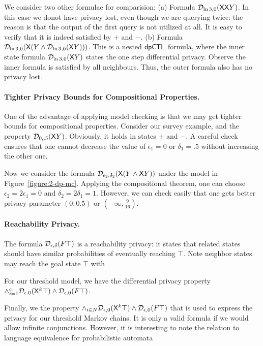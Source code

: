 We consider two other formulae for comparision:
(a) Formula $\mathcal{D}_{{\ln 3}, {0}} (\mathsf{X} \mathsf{X} Y)$. In this case we donot have privacy lost, even though we are querying twice: the reason is that the output of the first query is not utilized at all. It is easy to verify that it is indeed satisfied by $+$ and $-$.
(b) Formula $\mathcal{D}_{{\ln 3}, {0}} (\mathsf{X} (Y\wedge \mathcal{D}_{{\ln 3}, {0}}(\mathsf{X} Y)))$. This is a nested $\textsf{dpCTL}$ formula, where the inner state formula $\mathcal{D}_{{\ln 3}, {0}}(\mathsf{X} Y)$ states the one step differential privacy. Observe the inner formula is satisfied by all neighbours. Thus, the outer formula also has no privacy lost.

\paragraph{Tighter Privacy Bounds for Compositional Properties.}
One of the advantage of applying model checking is that we may get tighter bounds for compositional properties. Consider our survey example, and the property $\mathcal{D}_{{0}, {.5}} (\mathsf{X} Y)$. Obviously, it holds in states $+$ and $-$. A careful check ensures that one cannot decrease the value of $\epsilon_1=0$ or $\delta_1=.5$ without increasing the other one.


Now we consider the formula $\mathcal{D}_{{\epsilon_2}, {\delta_2}} (\mathsf{X} (Y\wedge \mathsf{X} Y))$ under the model in Figure~\ref{figure:2-dp-mc}. Applying the compositional theorem, one can choose $\epsilon_2=2\epsilon_1=0$ and $\delta_2=2\delta_1=1$. However, we can check easily that one gets better privacy parameter $(0,0.5)$ or $(-\infty,\frac{9}{16})$. 

\paragraph{Reachability Privacy.}
The formula $\mathcal{D}_{{\epsilon}, {\delta}}(F \top)$ is a reachability privacy: it states that related states should have similar probabilities of eventually reaching $\top$. Note neighbor states may reach the goal state $\top$ with 


For our threshold  model, we have the differential privacy property $\wedge_{i=1}^{c} \mathcal{D}_{{\epsilon}, {0}}(\mathsf{X}^k \top) \wedge \mathcal{D}_{{\epsilon}, {0}}(F \top)$. 

Finally, we the property
$\wedge_{i\in N} \mathcal{D}_{{\epsilon}, {0}}(\mathsf{X}^k \top) \wedge \mathcal{D}_{{\epsilon}, {0}}(F \top)$ that is used to express the privacy for our threshold Markov chains. It is only a valid formula if we would allow infinite conjunctions. However, it is interesting to note the relation to language equivalence for probabilistic automata


